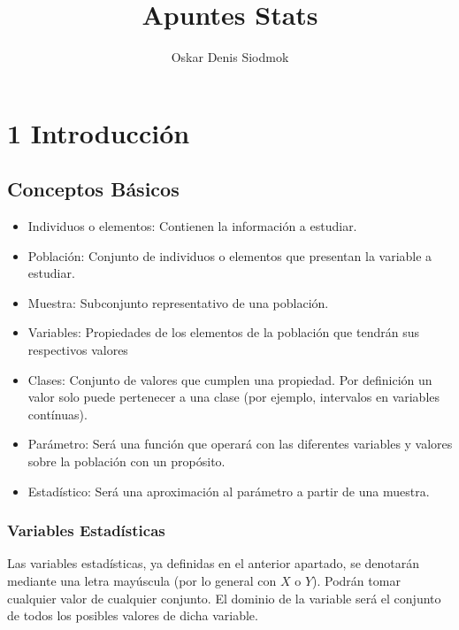 \documentclass[10pt,a4paper]{book}
\title{Apuntes Stats}
\author{Oskar Denis Siodmok}
\begin{document}
\maketitle


\setcounter{chapter}{1}
\chapter*{\color{blue}\textbf{1} \color{black} Introducción}


\section{Conceptos Básicos}
\begin{itemize}
	\item Individuos o elementos: Contienen la información a estudiar.
	\item Población: Conjunto de individuos o elementos que presentan la variable a estudiar.
	\item Muestra: Subconjunto representativo de una población.
	\item Variables: Propiedades de los elementos de la población que tendrán sus respectivos valores
	\item Clases: Conjunto de valores que cumplen una propiedad. Por definición un valor solo puede pertenecer a una clase (por ejemplo, intervalos en variables contínuas).
	\item Parámetro: Será una función que operará con las diferentes variables y valores sobre la población con un propósito.
	\item Estadístico: Será una aproximación al parámetro a partir de una muestra.
\end{itemize}

\subsection{Variables Estadísticas}
Las variables estadísticas, ya definidas en el anterior apartado, se denotarán mediante una letra mayúscula (por lo general con \(X\) o \(Y\)). Podrán tomar cualquier valor de cualquier conjunto. El dominio de la variable será el conjunto de todos los posibles valores de dicha variable.
\end{document}
